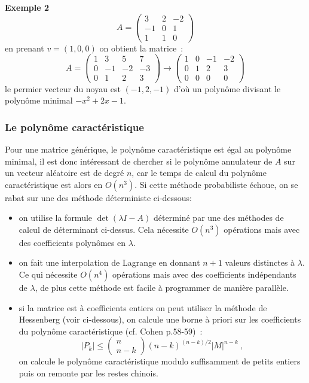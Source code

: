 \documentclass[a4paper,11pt]{article}
\begin{document}
\begin{giacjshere}
{\bf Exemple 2}\\
\[ A=\left(\begin{array}{ccc}
 3 & 2 & -2 \\
-1 &0 &1 \\
1 & 1 & 0 
\end{array}\right) \]
en prenant $v=(1,0,0)$ on obtient la matrice~:
\[ A=\left(\begin{array}{cccc}
1 & 3 & 5 & 7 \\
0 & -1 & -2 & -3 \\
0 & 1 & 2 & 3
\end{array}\right) \rightarrow
\left(\begin{array}{cccc}
1 & 0 & -1 & -2 \\
0 & 1 & 2 & 3 \\
0 & 0 & 0 & 0 
\end{array}\right) \]
le permier vecteur du noyau est $(-1,2,-1)$ d'où un polynôme divisant
le polynôme minimal $-x^2+2x-1$.

\subsubsection{Le polyn\^ome caract\'eristique}
Pour une matrice générique, le polynôme caractéristique est égal
au polynôme minimal, il est donc intéressant de chercher si le polynôme
annulateur de $A$ sur un vecteur aléatoire est de degré $n$, 
car le temps de calcul du polynôme caractéristique est alors en $O(n^3)$. 
Si cette méthode probabiliste échoue, on se
rabat sur une des méthode déterministe ci-dessous:
\begin{itemize}
\item on utilise la formule $\det(\lambda I -A)$ déterminé par
une des m\'ethodes de calcul de d\'eterminant ci-dessus. Cela
nécessite $O(n^3)$ opérations mais avec des coefficients 
polynômes en $\lambda$.
\item on fait une interpolation de Lagrange en donnant $n+1$ valeurs
distinctes \`a $\lambda$. Ce qui nécessite $O(n^4)$ opérations mais avec
des coefficients indépendants de $\lambda$, de plus cette m\'ethode 
est facile \`a programmer de mani\`ere parall\`ele.
\item si la matrice est \`a coefficients entiers
on peut utiliser la m\'ethode de Hessenberg (voir ci-dessous), on calcule
une borne \`a priori sur les coefficients du polyn\^ome caract\'eristique
(cf. Cohen p.58-59)~:
\[ |P_k| \leq \left( \begin{array}{c} n \\ n-k\end{array}\right) 
(n-k)^{(n-k)/2} |M|^{n-k} \ ,\]
on calcule le polyn\^ome caract\'eristique modulo suffisamment
de petits entiers puis on remonte par les restes chinois.
\end{itemize}


\end{giacjshere}
\end{document}
